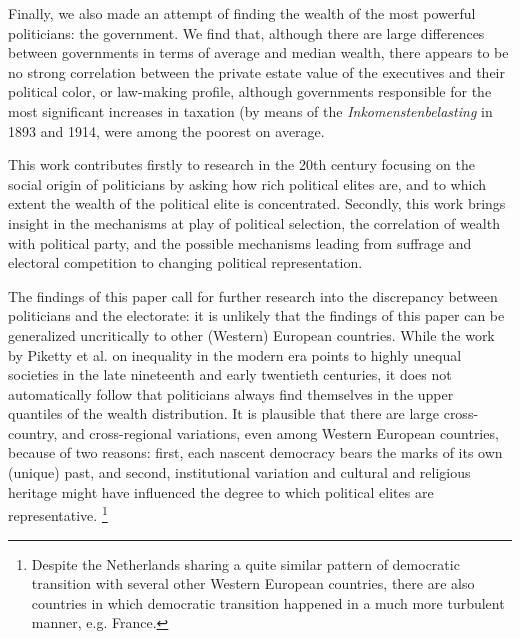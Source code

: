 Finally, we also made an attempt of finding the wealth of the most powerful politicians: the government. We find that, although there are large differences between governments in terms of average and median wealth, there appears to be no strong correlation between the private estate value of the executives and their political color, or law-making profile, although governments responsible for the most significant increases in taxation (by means of the \textit{Inkomenstenbelasting} in 1893 and 1914, were among the poorest on average.

This work contributes firstly to research in the 20th century focusing on the social origin of politicians by asking how rich political elites are, and to which extent the wealth of the political elite is concentrated. \autocite{van1983toegang, secker1989social, secker1991ministers, van1999eerste, moes2012onder} Secondly, this work brings insight in the mechanisms at play of political selection, the correlation of wealth with political party, and the possible mechanisms leading from suffrage and electoral competition to changing political representation.  \autocite{besley2005political, dal2018progress}

The findings of this paper call for further research into the discrepancy between politicians and the electorate: it is unlikely that the findings of this paper can be generalized uncritically to other (Western) European countries. While the work by Piketty et al. on inequality in the modern era points to highly unequal societies in the late nineteenth and early twentieth centuries, it does not automatically follow that politicians always find themselves in the upper quantiles of the wealth distribution. \autocite{piketty2003income, piketty2014inequality} It is plausible that there are large cross-country, and cross-regional variations, even among Western European countries, because of two reasons: first, each nascent democracy bears the marks of its own (unique) past, and second, institutional variation and cultural and religious heritage might have influenced the degree to which political elites are representative. \autocite{acemoglu2011consequences} \footnote{Despite the Netherlands sharing a quite similar pattern of democratic transition with several other Western European countries, there are also countries in which democratic transition happened in a much more turbulent manner, e.g. France. }

